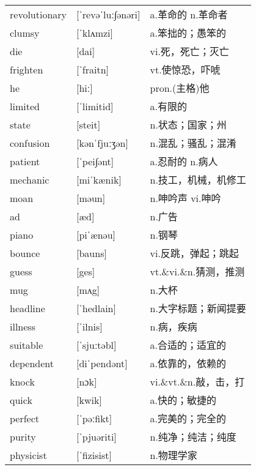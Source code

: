 \documentclass[a4paper]{article}
\begin{document}
\section{}
\begin{tabular}{l l l}

revolutionary & [ˈrevəˈluː∫ənəri] & a.革命的 n.革命者 \\
clumsy & [ˈklʌmzi] & a.笨拙的；愚笨的 \\
die & [dai] & vi.死，死亡；灭亡 \\
frighten & [ˈfraitn] & vt.使惊恐，吓唬 \\
he & [hiː] & pron.(主格)他 \\
limited & [ˈlimitid] & a.有限的 \\
state & [steit] & n.状态；国家；州 \\
confusion & [kənˈfjuːʒən] & n.混乱；骚乱；混淆 \\
patient & [ˈpei∫ənt] & a.忍耐的 n.病人 \\
mechanic & [miˈkænik] & n.技工，机械，机修工 \\
moan & [məun] & n.呻吟声 vi.呻吟 \\
ad & [æd] & n.广告 \\
piano & [piˈænəu] & n.钢琴 \\
bounce & [bauns] & vi.反跳，弹起；跳起 \\
guess & [ges] & vt.\&vi.\&n.猜测，推测 \\
mug & [mʌg] & n.大杯 \\
headline & [ˈhedlain] & n.大字标题；新闻提要 \\
illness & [ˈilnis] & n.病，疾病 \\
suitable & [ˈsjuːtəbl] & a.合适的；适宜的 \\
dependent & [diˈpendənt] & a.依靠的，依赖的 \\
knock & [nɔk] & vi.\&vt.\&n.敲，击，打 \\
quick & [kwik] & a.快的；敏捷的 \\
perfect & [ˈpəːfikt] & a.完美的；完全的 \\
purity & [ˈpjuəriti] & n.纯净；纯洁；纯度 \\
physicist & [ˈfizisist] & n.物理学家 \\

\end{tabular}
\end{document}
